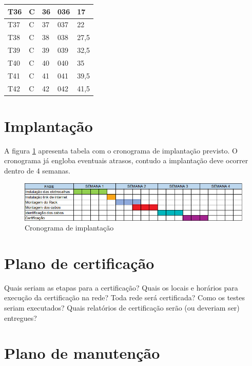 \documentclass[	DIV=calc,%
paper=a4,%
fontsize=12pt,%
onecolumn]{scrartcl}	 					%
\begin{document}
\begin{table}[h]
\begin{tabular}{|l|l|l|l|l|}
			T36                 & C     & 36                & 036      & 17  \\ \hline
			T37                 & C     & 37                & 037      & 22  \\ \hline
			T38                 & C     & 38                & 038      & 27,5 \\ \hline
			T39                 & C     & 39                & 039      & 32,5 \\ \hline
			T40                 & C     & 40                & 040      & 35   \\ \hline
			T41                 & C     & 41                & 041      & 39,5 \\ \hline
			T42                 & C     & 42                & 042      & 41,5 \\ \hline
		\end{tabular}
	\end{table}
\clearpage	
	
	\section{Implantação}
A figura \ref{fig5} apresenta tabela com o cronograma de implantação previsto. O cronograma já engloba eventuais atrasos, contudo a implantação deve ocorrer dentro de 4 semanas.
		\begin{figure}[h]
			\centering
			
			\includegraphics[width=\textwidth]{fig5}
			\caption{Cronograma de implantação}
			\label{fig5}
		\end{figure}
	
	\section{Plano de certificação}
	Quais seriam as etapas para a certificação? 
	Quais os locais e horários para execução da certificação na rede? Toda rede será certificada?
	Como os testes seriam executados?
	Quais relatórios de certificação serão (ou deveriam ser) entregues? 
	
	\section{Plano de manutenção}
	
\end{document}
